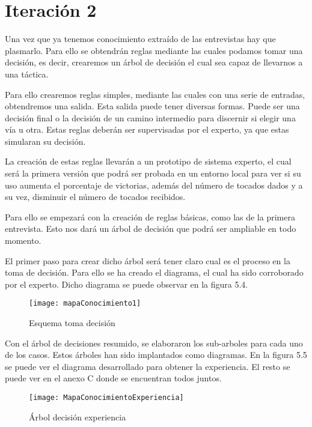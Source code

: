 \section{Iteración 2}

Una vez que ya tenemos conocimiento extraído de las entrevistas hay que plasmarlo.
Para ello se obtendrán reglas mediante las cuales podamos tomar una decisión, es decir,
crearemos un árbol de decisión el cual sea capaz de llevarnos a una táctica.

Para ello crearemos reglas simples, mediante las cuales con una serie de entradas,
obtendremos una salida. Esta salida puede tener diversas formas. Puede ser una decisión final
o la decisión de un camino intermedio para discernir si elegir una vía u otra.
Estas reglas deberán ser supervisadas por el experto, ya que estas simularan su decisión.

La creación de estas reglas llevarán a un prototipo de sistema experto, el cual será
la primera versión que podrá ser probada en un entorno local para ver si su uso aumenta
el porcentaje de victorias, además del número de tocados dados y a su vez, disminuir el
número de tocados recibidos.

Para ello se empezará con la creación de reglas básicas, como las de la primera entrevista. Esto
nos dará un árbol de decisión que podrá ser ampliable en todo momento.

El primer paso para crear dicho árbol será tener claro cual es el proceso en la toma de decisión.
Para ello se ha creado el diagrama, el cual ha sido corroborado por el experto. Dicho diagrama
se puede observar en la figura 5.4.

\begin{figure}[htb]
  \centering
    \texttt{[image: mapaConocimiento1]}
  \caption[Esquema toma decisión]{Esquema toma decisión}
  \label{fig:Esquema toma decisión}
\end{figure}


Con el árbol de decisiones resumido, se elaboraron los sub-arboles para cada uno de los casos.
Estos árboles han sido implantados como diagramas. En la figura 5.5 se puede ver el diagrama
desarrollado para obtener la experiencia. El resto se puede ver en el anexo C donde se encuentran
todos juntos.

\begin{figure}[htb]
  \centering
    \texttt{[image: MapaConocimientoExperiencia]}
  \caption[Árbol decisión experiencia]{Árbol decisión experiencia}
  \label{fig:Arbol decisión experiencia}
\end{figure}

